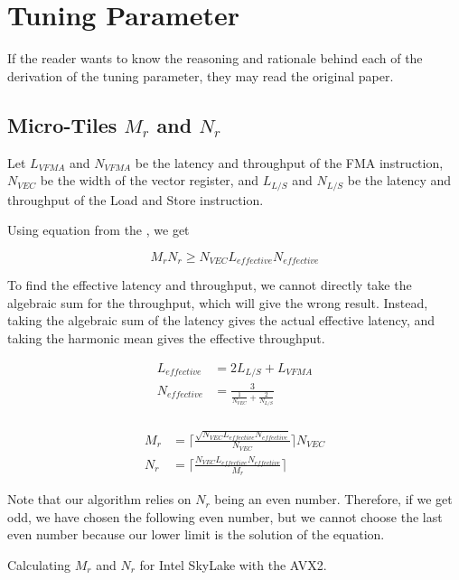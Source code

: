 \section{Tuning Parameter}

If the reader wants to know the reasoning and rationale 
behind each of the derivation of the tuning parameter, 
they may read the original \cite{BLIS} paper.

\subsection{Micro-Tiles $M_r$ and $N_r$}
\label{sec:mr_nr_calculation}

Let $L_{VFMA}$ and $N_{VFMA}$ be the latency and throughput of the FMA instruction, 
$N_{VEC}$ be the width of the vector register, and
$L_{L/S}$ and $N_{L/S}$ be the latency and throughput of 
the Load and Store instruction.

Using equation from the \cite{BLIS}, we get

\begin{equation}
    M_rN_r \geq N_{VEC} L_{effective} N_{effective}
\end{equation}

To find the effective latency and throughput, we cannot directly take the 
algebraic sum for the throughput, which will give the wrong result. Instead, taking the 
algebraic sum of the latency gives the actual effective latency, 
and taking the harmonic mean gives the effective throughput.

\begin{align*}
    L_{effective} &= 2L_{L/S} + L_{VFMA}\\
    N_{effective} &= \frac{3}{ \frac{1}{N_{VEC}} + \frac{2}{N_{L/S}} } \\
\end{align*}

\begin{align*}
    M_r &= \lceil \frac{ \sqrt{N_{VEC} L_{effective} N_{effective}} }{N_{VEC}} \rceil N_{VEC} \\
    N_r &= \lceil \frac{ N_{VEC} L_{effective} N_{effective} }{M_r} \rceil
\end{align*}

Note that our algorithm relies on $N_r$ being an even number.  
Therefore, if we get odd, we have chosen the following even number, 
but we cannot choose the last even number because our lower limit 
is the solution of the equation.

Calculating $M_r$ and $N_r$ for Intel SkyLake with the AVX2.

